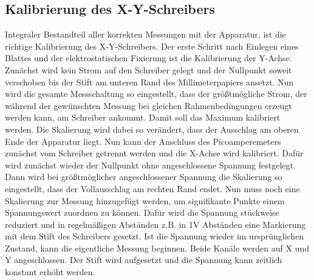 \subsection{Kalibrierung des X-Y-Schreibers}
Integraler Bestandteil aller korrekten Messungen mit der Apparatur, ist die richtige Kalibrierung 
des X-Y-Schreibers. Der erste Schritt nach Einlegen eines Blattes und der elektrostatischen Fixierung ist 
die Kalibrierung der Y-Achse. Zunächst wird kein Strom auf den Schreiber gelegt und der Nullpunkt soweit
verschoben bis der Stift am unteren Rand des Millimeterpapiers ansetzt. Nun wird die gesamte Messschaltung so eingestellt,
dass der größtmögliche Strom, der während der gewünschten Messung bei gleichen Rahmenbedingungen erzeugt werden kann, am 
Schreiber ankommt. Damit soll das Maximum kalibriert werden. Die Skalierung wird dabei so verändert, dass der Ausschlag am oberen Ende 
der Apparatur liegt. Nun kann der Anschluss des Picoamperemeters zunächst vom Schreiber getrennt werden und die X-Achse wird kalibriert.
Dafür wird zunächst wieder der Nullpunkt ohne angeschlossene Spannung festgelegt. Dann wird bei größtmöglicher angeschlossener Spannung 
die Skalierung so eingestellt, dass der Vollausschlag am rechten Rand endet. Nun muss noch eine Skalierung zur 
Messung hinzugefügt werden, um signifikante Punkte einem Spannungswert zuordnen zu können. Dafür wird die Spannung 
stückweise reduziert und in regelmäßigen Abständen z.B. in 1V Abständen eine Markierung mit dem Stift des Schreibers gesetzt.
Ist die Spannung wieder im ursprünglichen Zustand, kann die eigentliche Messung beginnen. Beide 
Kanäle werden auf X und Y angeschlossen. Der Stift wird aufgesetzt und die Spannung kann zeitlich konstant erhöht werden.
